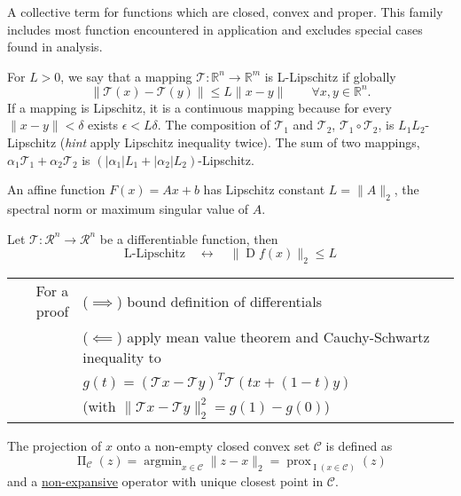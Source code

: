 \documentclass[preview, multi={definition, remark, theorem, proposition, example, literature}, border=0.2in]{standalone}
\DeclareMathOperator{\prox}{prox}
\DeclareMathOperator*{\argmin}{argmin}
\DeclareMathOperator{\jacobian}{D}
\DeclareMathOperator{\proj}{\Pi}
\DeclareMathOperator{\indicator}{I}
\newcommand*\from{\colon}
\begin{document}
\begin{definition}[label=g87jzem_, name=Closed Convex Proper]
		A collective term for functions which are closed, convex and proper. This family includes most function encountered in application and excludes special cases found in analysis.
\end{definition}
\begin{definition}[label=5nalj3hx, name=Lipschitz Regularity]
	For \( L > 0 \), we say that a mapping \( \mathcal T\from\mathbb R^n\to\mathbb R^m \) is L-Lipschitz if globally
	\[
		\lVert \mathcal T(x) - \mathcal T(y) \rVert \leq L\lVert x - y\rVert \qquad \forall x,y\in\mathbb R^n.
	\]
	If a mapping is Lipschitz, it is a continuous mapping because for every
	\( \lVert x - y \rVert < \delta \) exists \( \epsilon < L \delta \). The composition of \( \mathcal T_1 \) and \( \mathcal T_2 \), 
	\( \mathcal T_1 \circ \mathcal T_2 \), is \( L_1L_2 \)-Lipschitz (\textit{hint} apply Lipschitz inequality twice).
	The sum of two mappings, \( \alpha_1\mathcal T_1 + \alpha_2\mathcal T_2 \) is \((|\alpha_1|L_1 + |\alpha_2|L_2)\)-Lipschitz.

	\begin{example}[label=17vzrkyq, name=Affine Function]
		An affine function \(F(x) = Ax + b\) has Lipschitz constant \(L=\lVert A\rVert_2\), 
		the spectral norm or maximum singular value of \(A\).
	\end{example}

	\begin{example}[label=jydhwyqa, name=Differentiable Function]
		Let \( \mathcal T\from\mathcal R^n\to\mathcal R^n\) be a differentiable function, then 
		\[
			\text{L-Lipschitz} \quad \leftrightarrow \quad \lVert\jacobian f(x)\rVert_2 \leq L
		\]

		\begin{tabular}{rl}
			For a proof & (\( \implies \)) bound definition of differentials \\
				    & (\( \impliedby \)) apply mean value
				    theorem and Cauchy-Schwartz inequality to \\
				    &\quad\(g(t) = (\mathcal Tx - \mathcal Ty)^T\mathcal T(tx + (1-t) y) \)\\
				    &\quad(with \(\lVert\mathcal Tx - \mathcal Ty\rVert^2_2 = g(1) - g(0)\))
		\end{tabular}
	\end{example}

	\begin{example}[label=5pxh2ufj, name=Projections]
		The projection of \(x\) onto a non-empty closed convex set \(
		\mathcal C\) is defined as 
		\[
			\proj_{\mathcal C}(z) = \argmin_{x\in\mathcal C}\lVert z
			-x\rVert_2 = \prox_{\indicator(x\in\mathcal C)}(z)
		\]
		and a \hyperref[2s6tfa1j]{non-expansive} operator with unique
		closest point in \( \mathcal C\).


\end{example}
\end{definition}
\end{document}
